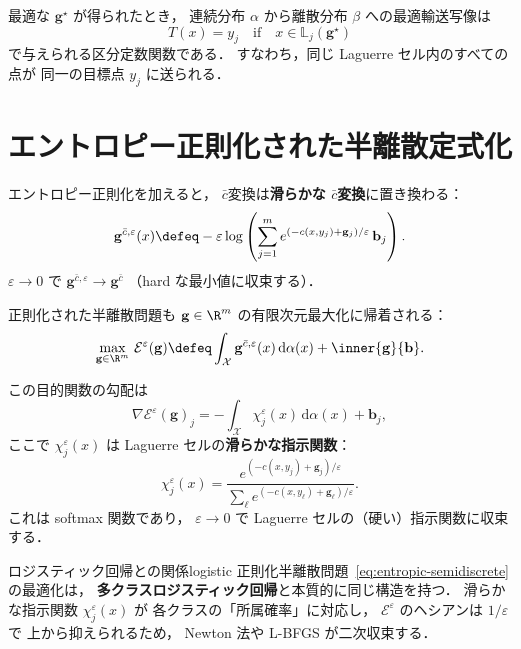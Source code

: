 最適な $\mathbf{g}^\star$ が得られたとき，
連続分布 $\alpha$ から離散分布 $\beta$ への最適輸送写像は
\begin{equation}\label{eq:semidiscrete-map}
  T(x) = y_j \quad \text{if}\quad x \in \mathbb{L}_j(\mathbf{g}^\star)
\end{equation}
で与えられる区分定数関数である．
すなわち，同じ Laguerre セル内のすべての点が
同一の目標点 $y_j$ に送られる．


\section{エントロピー正則化された半離散定式化}\label{sec:entropic-semidiscrete}

エントロピー正則化を加えると，
$\bar{c}$変換は\textbf{滑らかな $\bar{c}$変換}に置き換わる：
\begin{equation}\label{eq:smoothed-cbar}
  \mathbf{g}^{\bar{c},\varepsilon}(x)
  \defeq -\varepsilon \log \left(
    \sum_{j=1}^m e^{(-c(x, y_j) + \mathbf{g}_j)/\varepsilon}\, \mathbf{b}_j
  \right).
\end{equation}
$\varepsilon \to 0$ で $\mathbf{g}^{\bar{c},\varepsilon} \to \mathbf{g}^{\bar{c}}$
（hard な最小値に収束する）．

正則化された半離散問題も
$\mathbf{g} \in \R^m$ の有限次元最大化に帰着される：
\begin{equation}\label{eq:entropic-semidiscrete}
  \max_{\mathbf{g} \in \R^m}\,
  \mathcal{E}^\varepsilon(\mathbf{g})
  \defeq \int_{\mathcal{X}} \mathbf{g}^{\bar{c},\varepsilon}(x)\, \mathrm{d}\alpha(x)
  + \inner{\mathbf{g}}{\mathbf{b}}.
\end{equation}

この目的関数の勾配は
\[
  \nabla \mathcal{E}^\varepsilon(\mathbf{g})_j
  = -\int_{\mathcal{X}} \chi^\varepsilon_j(x)\, \mathrm{d}\alpha(x) + \mathbf{b}_j,
\]
ここで $\chi^\varepsilon_j(x)$ は Laguerre セルの\textbf{滑らかな指示関数}：
\[
  \chi^\varepsilon_j(x)
  = \frac{e^{(-c(x,y_j) + \mathbf{g}_j)/\varepsilon}}
         {\sum_\ell e^{(-c(x,y_\ell) + \mathbf{g}_\ell)/\varepsilon}}.
\]
これは softmax 関数であり，
$\varepsilon \to 0$ で Laguerre セルの（硬い）指示関数に収束する．

\begin{remark}{ロジスティック回帰との関係}{logistic}
正則化半離散問題~\eqref{eq:entropic-semidiscrete}の最適化は，
\textbf{多クラスロジスティック回帰}と本質的に同じ構造を持つ．
滑らかな指示関数 $\chi^\varepsilon_j(x)$ が
各クラスの「所属確率」に対応し，
$\mathcal{E}^\varepsilon$ のヘシアンは $1/\varepsilon$ で
上から抑えられるため，
Newton 法や L-BFGS が二次収束する．
\end{remark}


